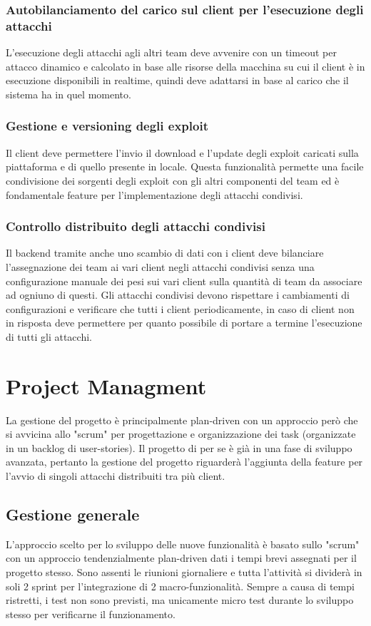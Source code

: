 \documentclass[11pt]{article}
\begin{document}
\subsubsection{Autobilanciamento del carico sul client per l'esecuzione degli attacchi}
L'esecuzione degli attacchi agli altri team deve avvenire con un timeout per attacco dinamico e calcolato in base alle risorse della macchina su cui il client è in esecuzione disponibili in realtime, quindi deve adattarsi in base al carico che il sistema ha in quel momento.
\subsubsection{Gestione e versioning degli exploit}
Il client deve permettere l'invio il download e l'update degli exploit caricati sulla piattaforma e di quello presente in locale. Questa funzionalità permette una facile condivisione dei sorgenti degli exploit con gli altri componenti del team ed è fondamentale feature per l'implementazione degli attacchi condivisi.
\subsubsection{Controllo distribuito degli attacchi condivisi}
Il backend tramite anche uno scambio di dati con i client deve bilanciare l'assegnazione dei team ai vari client negli attacchi condivisi senza una configurazione manuale dei pesi sui vari client sulla quantità di team da associare ad ogniuno di questi. Gli attacchi condivisi devono rispettare i cambiamenti di configurazioni e verificare che tutti i client periodicamente, in caso di client non in risposta deve permettere per quanto possibile di portare a termine l'esecuzione di tutti gli attacchi.
\section{Project Managment}
La gestione del progetto è principalmente plan-driven con un approccio però che si avvicina allo "scrum" per progettazione e organizzazione dei task (organizzate in un backlog di user-stories). Il progetto di per se è già in una fase di sviluppo avanzata, pertanto la gestione del progetto riguarderà l'aggiunta della feature per l'avvio di singoli attacchi distribuiti tra più client.
\subsection{Gestione generale}
L'approccio scelto per lo sviluppo delle nuove funzionalità è basato sullo "scrum" con un approccio tendenzialmente plan-driven dati i tempi brevi assegnati per il progetto stesso. Sono assenti le riunioni giornaliere e tutta l'attività si dividerà in soli 2 sprint per l'integrazione di 2 macro-funzionalità.
Sempre a causa di tempi ristretti, i test non sono previsti, ma unicamente micro test durante lo sviluppo stesso per verificarne il funzionamento.
\end{document}
